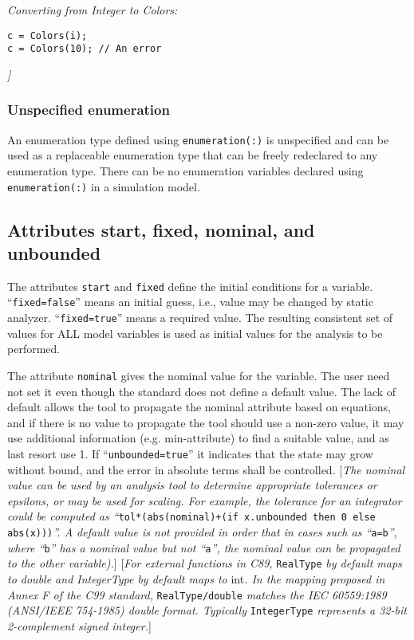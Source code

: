 \emph{Converting from Integer to Colors: }
\begin{lstlisting}[language=modelica]
c = Colors(i);
c = Colors(10); // An error
\end{lstlisting}

\emph{{]}}

\subsubsection{Unspecified enumeration}

An enumeration type defined using \lstinline!enumeration(:)! is unspecified and can
be used as a replaceable enumeration type that can be freely redeclared
to any enumeration type. There can be no enumeration variables declared
using \lstinline!enumeration(:)! in a simulation model.



\subsection{Attributes start, fixed, nominal, and unbounded}

The attributes \lstinline!start! and \lstinline!fixed! define the initial conditions for a
variable. ``\lstinline!fixed=false!'' means an initial guess, i.e., value may be
changed by static analyzer. ``\lstinline!fixed=true!'' means a required value. The
resulting consistent set of values for ALL model variables is used as
initial values for the analysis to be performed.

The attribute \lstinline!nominal! gives the nominal value for the variable. The user
need not set it even though the standard does not define a default
value. The lack of default allows the tool to propagate the nominal
attribute based on equations, and if there is no value to propagate the
tool should use a non-zero value, it may use additional information
(e.g. min-attribute) to find a suitable value, and as last resort use 1.
If ``\lstinline!unbounded=true!'' it indicates that the state may grow without
bound, and the error in absolute terms shall be controlled. {[}\emph{The
nominal value can be used by an analysis tool to determine appropriate
tolerances or epsilons, or may be used for scaling. For example, the
tolerance for an integrator could be computed as
``}\lstinline!tol*(abs(nominal)+(if x.unbounded then 0 else abs(x)))!\emph{''. A
default value is not provided in order that in cases such as
``}\lstinline!a=b!\emph{'', where ``}\lstinline!b!\emph{'' has a nominal value but not
``}\lstinline!a!\emph{'', the nominal value can be propagated to the other
variable).}{]} {[}\emph{For external functions in C89,} \lstinline!RealType!
\emph{by default maps to double and IntegerType by default maps to}
int\emph{. In the mapping proposed in Annex F of the C99 standard,}
\lstinline!RealType/double! \emph{matches the IEC 60559:1989 (ANSI/IEEE 754-1985)
double format. Typically} \lstinline!IntegerType! \emph{represents a 32-bit
2-complement signed integer.}{]}

